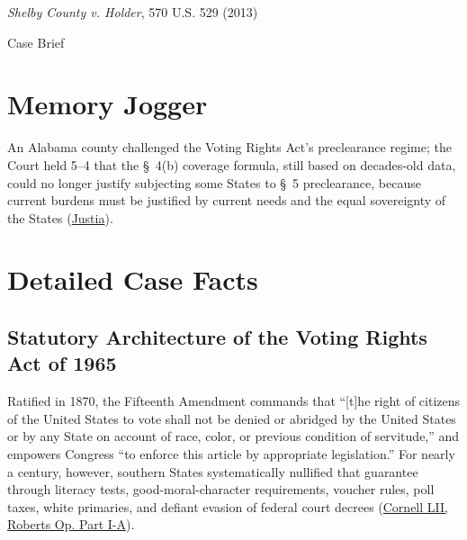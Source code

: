 \documentclass[12pt]{article}
\begin{document}
\begin{center}
{\LARGE \textit{Shelby County v. Holder}, 570 U.S. 529 (2013)\par}
\vspace{0.8em}
{\large Case Brief\par}
\end{center}
\vspace{1em}

\section{Memory Jogger}
An Alabama county challenged the Voting Rights Act's preclearance regime; the Court held 5--4 that the \S~4(b) coverage formula, still based on decades-old data, could no longer justify subjecting some States to \S~5 preclearance, because current burdens must be justified by current needs and the equal sovereignty of the States (\href{https://supreme.justia.com/cases/federal/us/570/529/}{Justia}).

\section{Detailed Case Facts}
\subsection{Statutory Architecture of the Voting Rights Act of 1965}
Ratified in 1870, the Fifteenth Amendment commands that ``[t]he right of citizens of the United States to vote shall not be denied or abridged by the United States or by any State on account of race, color, or previous condition of servitude,'' and empowers Congress ``to enforce this article by appropriate legislation.'' For nearly a century, however, southern States systematically nullified that guarantee through literacy tests, good-moral-character requirements, voucher rules, poll taxes, white primaries, and defiant evasion of federal court decrees (\href{https://www.law.cornell.edu/supremecourt/text/12-96}{Cornell LII, Roberts Op. Part I-A}).
\end{document}
